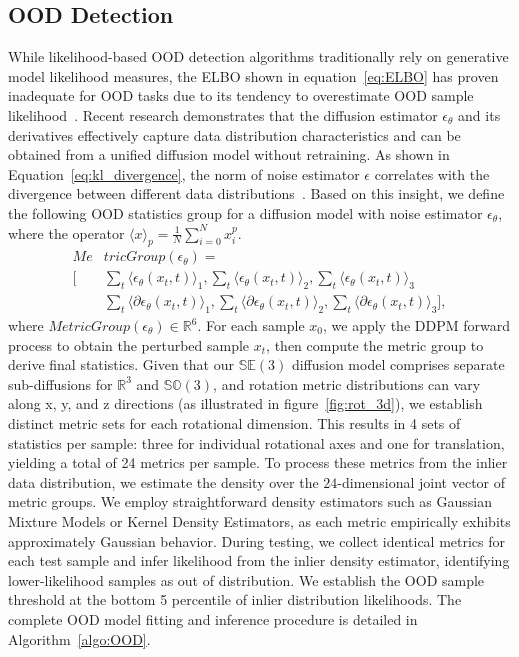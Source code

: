 \subsection{OOD Detection}
While likelihood-based \ac{OOD} detection algorithms traditionally rely on generative model likelihood measures, the ELBO shown in equation~\ref{eq:ELBO} has proven inadequate for \ac{OOD} tasks due to its tendency to overestimate OOD sample likelihood~\citep{Serrà2020Input}. Recent research demonstrates that the diffusion estimator $\epsilon_\theta$ and its derivatives effectively capture data distribution characteristics and can be obtained from a unified diffusion model without retraining. As shown in Equation~\ref{eq:kl_divergence}, the norm of noise estimator $\epsilon$ correlates with the divergence between different data distributions~\citep{heng2024out}. Based on this insight, we define the following OOD statistics group for a diffusion model with noise estimator $\epsilon_\theta$, where the operator $\langle x\rangle_p = \frac{1}{N}\sum_{i=0}^N x_i^p$.
\begin{align}
    Me&tricGroup(\epsilon_{\theta}) = \nonumber \\
    \Bigg[&\sum_t\langle\epsilon_{\theta}(x_t, t)\rangle_1, \sum_t\langle\epsilon_{\theta}(x_t, t)\rangle_2, \sum_t\langle\epsilon_{\theta}(x_t, t)\rangle_3 \nonumber\\
    &\sum_t\langle\partial\epsilon_{\theta}(x_t, t)\rangle_1, \sum_t\langle\partial\epsilon_{\theta}(x_t, t)\rangle_2, \sum_t\langle\partial\epsilon_{\theta}(x_t, t)\rangle_3 \Bigg],
\end{align}
where $MetricGroup(\epsilon_{\theta})\in\mathbb{R}^{6}$. For each sample $x_0$, we apply the DDPM forward process to obtain the perturbed sample $x_t$, then compute the metric group to derive final statistics. Given that our $\mathbb{SE}(3)$ diffusion model comprises separate sub-diffusions for $\mathbb{R}^{3}$ and $\mathbb{SO}(3)$, and rotation metric distributions can vary along x, y, and z directions (as illustrated in figure~\ref{fig:rot_3d}), we establish distinct metric sets for each rotational dimension. This results in 4 sets of statistics per sample: three for individual rotational axes and one for translation, yielding a total of 24 metrics per sample.
To process these metrics from the inlier data distribution, we estimate the density over the $24$-dimensional joint vector of metric groups. We employ straightforward density estimators such as Gaussian Mixture Models or Kernel Density Estimators, as each metric empirically exhibits approximately Gaussian behavior. During testing, we collect identical metrics for each test sample and infer likelihood from the inlier density estimator, identifying lower-likelihood samples as out of distribution. We establish the \ac{OOD} sample threshold at the bottom 5 percentile of inlier distribution likelihoods. The complete OOD model fitting and inference procedure is detailed in Algorithm~\ref{algo:OOD}.

